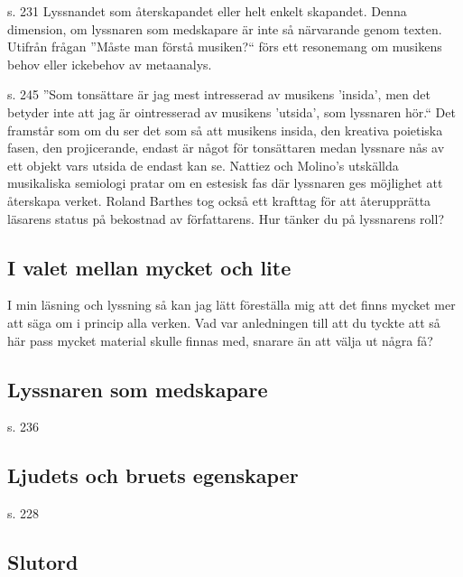 \documentclass{article}
\begin{document}
s. 231 Lyssnandet som återskapandet eller helt enkelt skapandet. Denna dimension, om lyssnaren som medskapare är inte så närvarande genom texten. Utifrån frågan ''Måste man förstå musiken?`` förs ett resonemang om musikens behov eller ickebehov av metaanalys.

s. 245 ''Som tonsättare är jag mest intresserad av musikens 'insida', men det betyder inte att jag är ointresserad av musikens 'utsida', som lyssnaren hör.`` Det framstår som om du ser det som så att musikens insida, den kreativa poietiska fasen, den projicerande, endast är något för tonsättaren medan lyssnare nås av ett objekt vars utsida de endast kan se. Nattiez och Molino's utskällda musikaliska semiologi pratar om en estesisk fas där lyssnaren ges möjlighet att återskapa verket. Roland Barthes tog också ett krafttag för att återupprätta läsarens status på bekostnad av författarens. Hur tänker du på lyssnarens roll?


\subsection{I valet mellan mycket och lite}

I min läsning och lyssning så kan jag lätt föreställa mig att det finns mycket mer att säga om i princip alla verken. Vad var anledningen till att du tyckte att så här pass mycket material skulle finnas med, snarare än att välja ut några få?


\subsection{Lyssnaren som medskapare}

s. 236


\subsection{Ljudets och bruets egenskaper}

s. 228


\subsection{Slutord}
\end{document}

